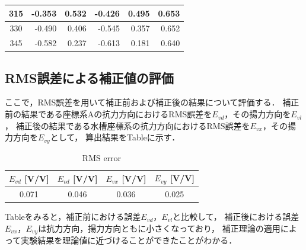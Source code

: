 \begin{table}[htbp]
\begin{center}
\begin{tabular}{|p{20mm}|p{20mm}|p{20mm}|p{20mm}|p{20mm}|p{20mm}|}
      \multicolumn{1}{|c|}{315}                     & \multicolumn{1}{|r|}{-0.353}               & \multicolumn{1}{|r|}{0.532}                & \multicolumn{1}{|r|}{-0.426}               & \multicolumn{1}{|r|}{0.495}                & \multicolumn{1}{|r|}{0.653}                    \\ \hline
      \multicolumn{1}{|c|}{330}                     & \multicolumn{1}{|r|}{-0.490}               & \multicolumn{1}{|r|}{0.406}                & \multicolumn{1}{|r|}{-0.545}               & \multicolumn{1}{|r|}{0.357}                & \multicolumn{1}{|r|}{0.652}                    \\ \hline
      \multicolumn{1}{|c|}{345}                     & \multicolumn{1}{|r|}{-0.582}               & \multicolumn{1}{|r|}{0.237}                & \multicolumn{1}{|r|}{-0.613}               & \multicolumn{1}{|r|}{0.181}                & \multicolumn{1}{|r|}{0.640}                    \\ \hline
    \end{tabular}
  \end{center}
\end{table}

\newpage

\subsection{RMS誤差による補正値の評価}

ここで，RMS誤差を用いて補正前および補正後の結果について評価する．
補正前の結果である座標系Aの抗力方向におけるRMS誤差を$E_{vd}$，その揚力方向を$E_{vl}$，
補正後の結果である水槽座標系の抗力方向におけるRMS誤差を$E_{vx}$，その揚力方向を$E_{vy}$として，
算出結果をTableに示す．

\begin{table}[htbp]
  \begin{center}
    \caption{RMS error}
    \begin{tabular}{|p{20mm}|p{20mm}p{20mm}|p{20mm}|}
      \hline
      \multicolumn{1}{|c|}{$E_{vd}$ [V/V]} & \multicolumn{1}{|c|}{$E_{vd}$ [V/V]} & \multicolumn{1}{|c|}{$E_{vx}$ [V/V]} & \multicolumn{1}{|c|}{$E_{vy}$ [V/V]} \\ \hline
      \multicolumn{1}{|c|}{0.071}          & \multicolumn{1}{|c|}{0.046}          & \multicolumn{1}{|c|}{0.036}          & \multicolumn{1}{|c|}{0.025}          \\ \hline
    \end{tabular}
  \end{center}
\end{table}

Tableをみると，補正前における誤差$E_{vd}$，$E_{vl}$と比較して，
補正後における誤差$E_{vx}$，$E_{vy}$は抗力方向，揚力方向ともに小さくなっており，
補正理論の適用によって実験結果を理論値に近づけることができたことがわかる．